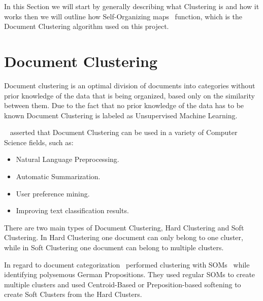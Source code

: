 
In this Section we will start by generally describing what Clustering is and how it works then we will outline how Self-Organizing maps~\cite{Kohonen1990} function, which is the Document Clustering algorithm used on this project.

\section{Document Clustering}
\label{sec:clustering}
Document clustering is an optimal division of documents into categories without prior knowledge of the data that is being organized, based only on the similarity between them. Due to the fact that no prior knowledge of the data has to be known Document Clustering is labeled as Unsupervised Machine Learning.

~\citet{Liu2012b} asserted that Document Clustering can be used in a variety of Computer Science fields, such as:
\begin{itemize}
  \item Natural Language Preprocessing.
  \item Automatic Summarization.
  \item User preference mining.
  \item Improving text classification results.
\end{itemize}

There are two main types of Document Clustering, Hard Clustering and Soft Clustering. In Hard Clustering one document can only belong to one cluster, while in Soft Clustering one document can belong to multiple clusters. 

In regard to document categorization~\citet{Springorum1998} performed clustering with SOMs~\citep{Kohonen1990} while identifying polysemous German Propositions. They used regular SOMs to create multiple clusters and used Centroid-Based or Preposition-based softening to create Soft Clusters from the Hard Clusters.

